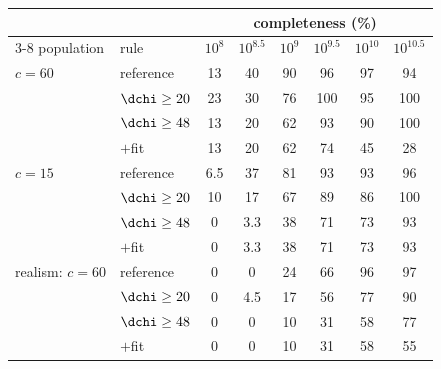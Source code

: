 \begin{tabular}[t]{@{}llcccccc@{}}
\toprule
 & & \multicolumn{6}{c}{completeness (\%)} \\ \cmidrule(lr){3-8}
population & rule & $10^{8}$ & $10^{8.5}$ & $10^{9}$ & $10^{9.5}$ & $10^{10}$ & $10^{10.5}$ \\
\midrule
$c=60$ & reference & 13 & 40 & 90 & 96 & 97 & 94 \\
 & $\dchi\ge20$ & 23 & 30 & 76 & 100 & 95 & 100 \\
 & $\dchi\ge48$ & 13 & 20 & 62 & 93 & 90 & 100 \\
 & $+$fit & 13 & 20 & 62 & 74 & 45 & 28 \\
\addlinespace
$c=15$ & reference & 6.5 & 37 & 81 & 93 & 93 & 96 \\
 & $\dchi\ge20$ & 10 & 17 & 67 & 89 & 86 & 100 \\
 & $\dchi\ge48$ & 0 & 3.3 & 38 & 71 & 73 & 93 \\
 & $+$fit & 0 & 3.3 & 38 & 71 & 73 & 93 \\
\addlinespace
realism: $c=60$ & reference & 0 & 0 & 24 & 66 & 96 & 97 \\
 & $\dchi\ge20$ & 0 & 4.5 & 17 & 56 & 77 & 90 \\
 & $\dchi\ge48$ & 0 & 0 & 10 & 31 & 58 & 77 \\
 & $+$fit & 0 & 0 & 10 & 31 & 58 & 55 \\
\bottomrule
\end{tabular}
